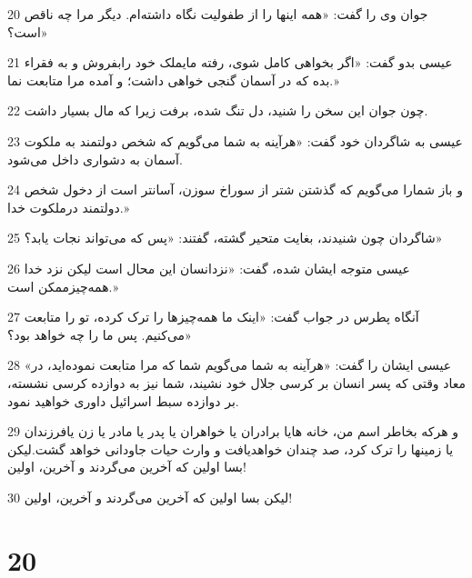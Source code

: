 \par 20 جوان وی را گفت: «همه اینها را از طفولیت نگاه داشته‌ام. دیگر مرا چه ناقص است؟»
\par 21 عیسی بدو گفت: «اگر بخواهی کامل شوی، رفته مایملک خود رابفروش و به فقراء بده که در آسمان گنجی خواهی داشت؛ و آمده مرا متابعت نما.»
\par 22 چون جوان این سخن را شنید، دل تنگ شده، برفت زیرا که مال بسیار داشت.
\par 23 عیسی به شاگردان خود گفت: «هرآینه به شما می‌گویم که شخص دولتمند به ملکوت آسمان به دشواری داخل می‌شود.
\par 24 و باز شمارا می‌گویم که گذشتن شتر از سوراخ سوزن، آسانتر است از دخول شخص دولتمند درملکوت خدا.»
\par 25 شاگردان چون شنیدند، بغایت متحیر گشته، گفتند: «پس که می‌تواند نجات یابد؟»
\par 26 عیسی متوجه ایشان شده، گفت: «نزدانسان این محال است لیکن نزد خدا همه‌چیزممکن است.»
\par 27 آنگاه پطرس در جواب گفت: «اینک ما همه‌چیزها را ترک کرده، تو را متابعت می‌کنیم. پس ما را چه خواهد بود؟»
\par 28 «عیسی ایشان را گفت: «هرآینه به شما می‌گویم شما که مرا متابعت نموده‌اید، در معاد وقتی که پسر انسان بر کرسی جلال خود نشیند، شما نیز به دوازده کرسی نشسته، بر دوازده سبط اسرائیل داوری خواهید نمود.
\par 29 و هر‌که بخاطر اسم من، خانه هایا برادران یا خواهران یا پدر یا مادر یا زن یافرزندان یا زمینها را ترک کرد، صد چندان خواهدیافت و وارث حیات جاودانی خواهد گشت.لیکن بسا اولین که آخرین می‌گردند و آخرین، اولین!
\par 30 لیکن بسا اولین که آخرین می‌گردند و آخرین، اولین!

\chapter{20}

